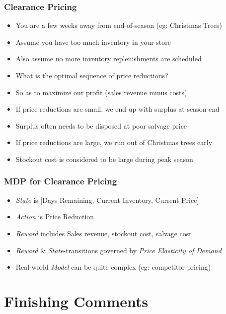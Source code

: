 \documentclass[handout]{beamer}
\begin{document}
\begin{frame}
\frametitle{Clearance Pricing}
\pause
\begin{itemize}[<+->]
\item You are a few weeks away from end-of-season (eg: Christmas Trees)
\item Assume you have too much inventory in your store
\item Also assume no more inventory replenishments are scheduled
\item What is the optimal sequence of price reductions?
\item So as to maximize our profit (sales revenue minus costs)
\item If price reductions are small, we end up with surplus at season-end
\item Surplus often needs to be disposed at poor salvage price
\item If price reductions are large, we run out of Christmas trees early
\item Stockout cost is considered to be large during peak season
\end{itemize}
\end{frame}

\begin{frame}
\frametitle{MDP for Clearance Pricing}
\pause
\begin{itemize}[<+->]
\item {\em State} is [Days Remaining, Current Inventory, Current Price]
\item {\em Action} is Price Reduction
\item {\em Reward} includes Sales revenue, stockout cost, salvage cost
\item {\em Reward} \& {\em State}-transitions governed by {\em Price Elasticity of Demand}
\item Real-world {\em Model} can be quite complex (eg: competitor pricing)
\end{itemize}
\end{frame}

\section{Finishing Comments}
\end{document}
